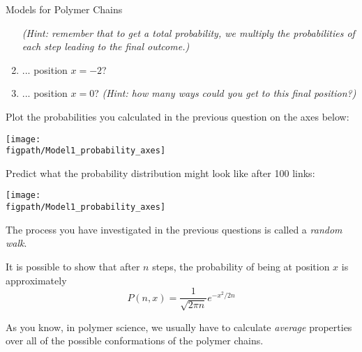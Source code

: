\begin{activity}{Models for Polymer Chains}
\begin{ctqs}
\begin{enumerate}
				\emph{(Hint: remember that to get a total probability, we \emph{multiply} the probabilities of each step leading to the final outcome.)}
				
				\begin{solution}[1in]
				\end{solution}
				
			\item ... position $x=-2$?
				
				\begin{solution}[1in]
				\end{solution}
			
			\clearpage
			\item ... position $x=0$?
				\emph{(Hint: how many ways could you get to this final position?)}
				
				\begin{solution}[1in]
				\end{solution}
			
		\end{enumerate}
		
	\question Plot the probabilities you calculated in the previous question on the axes below:
	
		\vspace{24pt}
		\centerline{\texttt{[image: \\figpath/Model1\_probability\_axes]}}
	
	\question Predict what the probability distribution might look like after 100 links:
	
		\vspace{24pt}
		\centerline{\texttt{[image: \\figpath/Model1\_probability\_axes]}}
	
\end{ctqs}

\begin{infobox}
	
	The process you have investigated in the previous questions is called a \emph{random walk}.
	
	It is possible to show that after $n$ steps, the probability of being at position $x$ is approximately
	\begin{equation*}
		P(n,x) = \frac{1}{\sqrt{2\pi n}}e^{-x^2/2n}
	\end{equation*}
	
\end{infobox}

\begin{ctqs}

	\question As you know, in polymer science, we usually have to calculate \emph{average} properties over all of the possible conformations of the polymer chains.
	

\end{ctqs}
\end{activity}
